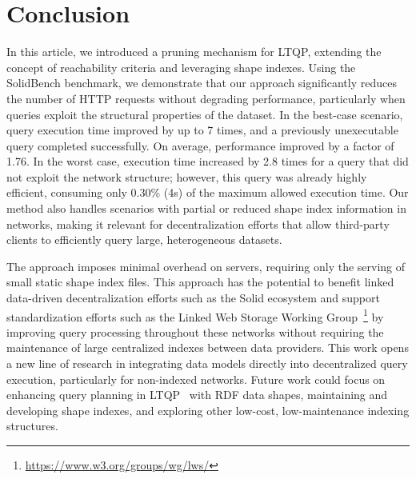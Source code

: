 \section{Conclusion}\label{sec:conclusion}

In this article, we introduced a pruning mechanism for LTQP, extending the concept of reachability criteria and leveraging shape indexes. 
Using the SolidBench benchmark, we demonstrate that our approach significantly reduces the number of HTTP requests without degrading performance, particularly when queries exploit the structural properties of the dataset.
In the best-case scenario, query execution time improved by up to 7 times, and a previously unexecutable query completed successfully.
On average, performance improved by a factor of 1.76.
In the worst case, execution time increased by 2.8 times for a query that did not exploit the network structure; however, this query was already highly efficient, consuming only 0.30\% (4s) of the maximum allowed execution time.
Our method also handles scenarios with partial or reduced shape index information in networks, making it relevant for decentralization efforts that allow third-party clients to efficiently query large, heterogeneous datasets.

The approach imposes minimal overhead on servers, requiring only the serving of small static shape index files. 
This approach has the potential to benefit linked data-driven decentralization efforts such as the Solid ecosystem and support standardization efforts such as the Linked Web Storage Working Group~\footnote{\url{https://www.w3.org/groups/wg/lws/}} by improving query processing throughout these networks without requiring the maintenance of large centralized indexes between data providers.
This work opens a new line of research in integrating data models directly into decentralized query execution, particularly for non-indexed networks. 
Future work could focus on enhancing query planning in LTQP~\cite{taelman2024towards} with RDF data shapes, 
maintaining and developing shape indexes, and exploring other low-cost, low-maintenance indexing structures.



